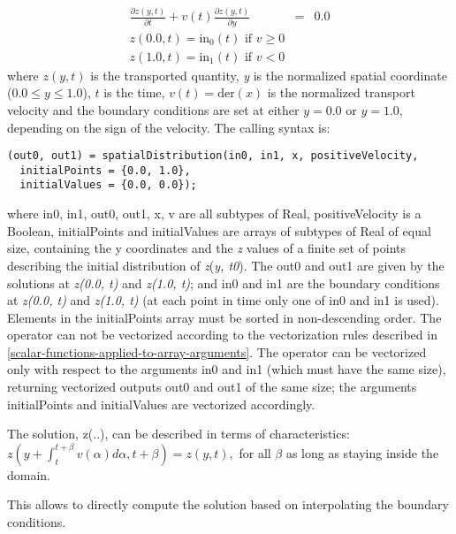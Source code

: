 \begin{eqnarray*}
\frac{\partial z(y,t)}{\partial t}+v(t)\frac{\partial z(y,t)}{\partial y}&=&0.0\\
z(0.0, t)=\mathrm{in}_0(t) \text{ if $v\ge 0$}\\
z(1.0, t)=\mathrm{in}_1(t) \text{ if $v<0$}
\end{eqnarray*}
where $z(y, t)$ is the transported quantity, \emph{y} is the
normalized spatial coordinate ($0.0 \le y \le 1.0$), $t$ is the
time, $v(t)=\mathrm{der}(x)$ is the normalized
transport velocity and the boundary conditions are set at either
$y=0.0$ or $y=1.0$, depending on the sign of the velocity.
The calling syntax is:
\begin{lstlisting}[language=modelica]
(out0, out1) = spatialDistribution(in0, in1, x, positiveVelocity,
  initialPoints = {0.0, 1.0},
  initialValues = {0.0, 0.0});
\end{lstlisting}
where in0, in1, out0, out1, x, v are all subtypes of Real,
positiveVelocity is a Boolean, initialPoints and initialValues are
arrays of subtypes of Real of equal size, containing the y coordinates
and the \emph{z} values of a finite set of points describing the initial
distribution of \emph{z}(\emph{y, t0}). The out0 and out1 are given by
the solutions at \emph{z(0.0, t)} and \emph{z(1.0, t)}; and in0 and in1
are the boundary conditions at \emph{z(0.0, t)} and \emph{z(1.0, t)} (at
each point in time only one of in0 and in1 is used). Elements in the
initialPoints array must be sorted in non-descending order. The operator
can not be vectorized according to the vectorization rules described in
\autoref{scalar-functions-applied-to-array-arguments}. The operator can be vectorized only with respect to the
arguments in0 and in1 (which must have the same size), returning
vectorized outputs out0 and out1 of the same size; the arguments
initialPoints and initialValues are vectorized accordingly.

The solution, z(..), can be described in terms of characteristics:
$z(y+\int_t^{t+\beta}v(\alpha)d\alpha,t+\beta)=z(y,t),$ for all $\beta$ as long as staying inside the domain.

This allows to directly compute the solution based on interpolating the
boundary conditions.

